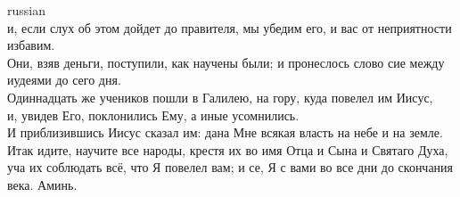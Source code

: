 \documentclass[10pt]{article} %
\begin{document}
{\begin{minipage}[t]{0.45\textwidth}
\begin{otherlanguage*}{russian}
\\
и, если слух об этом дойдет до правителя, мы убедим его, и вас от неприятности избавим.
\\
Они, взяв деньги, поступили, как научены были; и пронеслось слово сие между иудеями до сего дня.
\\
Одиннадцать же учеников пошли в Галилею, на гору, куда повелел им Иисус,
\\
и, увидев Его, поклонились Ему, а иные усомнились.
\\
И приблизившись Иисус сказал им: дана Мне всякая власть на небе и на земле.
\\
Итак идите, научите все народы, крестя их во имя Отца и Сына и Святаго Духа,
\\
уча их соблюдать всё, что Я повелел вам; и се, Я с вами во все дни до скончания века. Аминь.
\\

\end{otherlanguage*}
\end{minipage}
\hfill
\begin{minipage}[t]{0.45\textwidth}


\end{minipage}}
\end{document}
